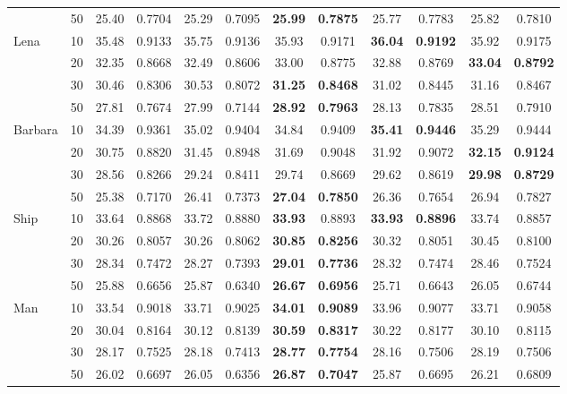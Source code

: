 \begin{table}[p]
{{\begin{tabular}{@{}ll*{5}{cc}@{}}
 & 50 & 25.40 & 0.7704 & 25.29 & 0.7095 & \textbf{25.99} & \textbf{0.7875} & 25.77 & 0.7783 & 25.82 & 0.7810 \\
\addlinespace[0.15ex]
Lena & 10 & 35.48 & 0.9133 & 35.75 & 0.9136 & 35.93 & 0.9171 & \textbf{36.04} & \textbf{0.9192} & 35.92 & 0.9175 \\
 & 20 & 32.35 & 0.8668 & 32.49 & 0.8606 & 33.00 & 0.8775 & 32.88 & 0.8769 & \textbf{33.04} & \textbf{0.8792} \\
 & 30 & 30.46 & 0.8306 & 30.53 & 0.8072 & \textbf{31.25} & \textbf{0.8468} & 31.02 & 0.8445 & 31.16 & 0.8467 \\
 & 50 & 27.81 & 0.7674 & 27.99 & 0.7144 & \textbf{28.92} & \textbf{0.7963} & 28.13 & 0.7835 & 28.51 & 0.7910 \\
\addlinespace[0.15ex]
Barbara & 10 & 34.39 & 0.9361 & 35.02 & 0.9404 & 34.84 & 0.9409 & \textbf{35.41} & \textbf{0.9446} & 35.29 & 0.9444 \\
 & 20 & 30.75 & 0.8820 & 31.45 & 0.8948 & 31.69 & 0.9048 & 31.92 & 0.9072 & \textbf{32.15} & \textbf{0.9124} \\
 & 30 & 28.56 & 0.8266 & 29.24 & 0.8411 & 29.74 & 0.8669 & 29.62 & 0.8619 & \textbf{29.98} & \textbf{0.8729} \\
 & 50 & 25.38 & 0.7170 & 26.41 & 0.7373 & \textbf{27.04} & \textbf{0.7850} & 26.36 & 0.7654 & 26.94 & 0.7827 \\
\addlinespace[0.15ex]
Ship & 10 & 33.64 & 0.8868 & 33.72 & 0.8880 & \textbf{33.93} & 0.8893 & \textbf{33.93} & \textbf{0.8896} & 33.74 & 0.8857 \\
 & 20 & 30.26 & 0.8057 & 30.26 & 0.8062 & \textbf{30.85} & \textbf{0.8256} & 30.32 & 0.8051 & 30.45 & 0.8100 \\
 & 30 & 28.34 & 0.7472 & 28.27 & 0.7393 & \textbf{29.01} & \textbf{0.7736} & 28.32 & 0.7474 & 28.46 & 0.7524 \\
 & 50 & 25.88 & 0.6656 & 25.87 & 0.6340 & \textbf{26.67} & \textbf{0.6956} & 25.71 & 0.6643 & 26.05 & 0.6744 \\
\addlinespace[0.15ex]
Man & 10 & 33.54 & 0.9018 & 33.71 & 0.9025 & \textbf{34.01} & \textbf{0.9089} & 33.96 & 0.9077 & 33.71 & 0.9058 \\
 & 20 & 30.04 & 0.8164 & 30.12 & 0.8139 & \textbf{30.59} & \textbf{0.8317} & 30.22 & 0.8177 & 30.10 & 0.8115 \\
 & 30 & 28.17 & 0.7525 & 28.18 & 0.7413 & \textbf{28.77} & \textbf{0.7754} & 28.16 & 0.7506 & 28.19 & 0.7506 \\
 & 50 & 26.02 & 0.6697 & 26.05 & 0.6356 & \textbf{26.87} & \textbf{0.7047} & 25.87 & 0.6695 & 26.21 & 0.6809 \\

\end{tabular}}}
\end{table}
